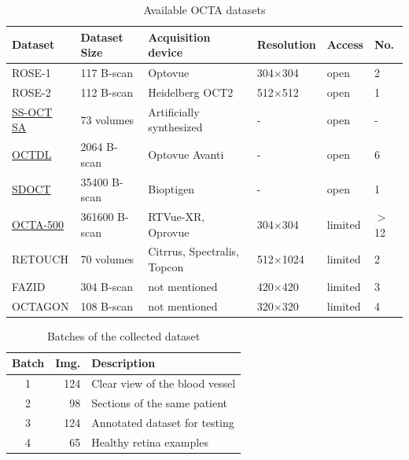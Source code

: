 \documentclass[conference]{IEEEtran}
\begin{document}
\begin{table}%
    \centering  %
    \caption{Available OCTA datasets}
    \label{tab:dataset_info}
    \begin{tabular}{llllll}
        \textbf{Dataset} & \textbf{Dataset Size} & \textbf{Acquisition device} & \textbf{Resolution} & \textbf{Access} & \textbf{No.} \\
        \hline
        ROSE-1 & 117 B-scan & Optovue & 304$\times$304 & open & 2 \\
        ROSE-2 & 112 B-scan & Heidelberg OCT2 & 512$\times$512 & open & 1 \\
        \href{https://ieee-dataport.org/documents/ss-oct-sa}{SS-OCT SA} & 73 volumes & Artificially synthesized & - & open & - \\
        \href{https://ieee-dataport.org/documents/octdl-optical-coherence-tomography-dataset-image-based-deep-learning-methods}{OCTDL} & 2064 B-scan & Optovue Avanti & - & open & 6 \\
        \href{https://people.duke.edu/~sf59/RPEDC_Ophth_2013_dataset.htm}{SDOCT} & 35400 B-scan & Bioptigen & - & open & 1 \\
        \href{https://ieee-dataport.org/open-access/octa-500}{OCTA-500} & 361600 B-scan & RTVue-XR, Oprovue & 304$\times$304 & limited & $>$12 \\
        RETOUCH & 70 volumes & Citrrus, Spectralis, Topcon & 512$\times$1024 & limited & 2 \\
        FAZID & 304 B-scan & not mentioned & 420$\times$420 & limited & 3 \\
        OCTAGON & 108 B-scan & not mentioned & 320$\times$320 & limited & 4 \\
    \end{tabular}
\end{table}

\begin{table}%
    \centering
    \caption{Batches of the collected dataset}
    \label{tab:batch_info}
    \begin{tabular}{crl}
        \textbf{Batch}  & \textbf{Img.}  & \textbf{Description} \\ \hline
        1  &  124 & Clear view of the blood vessel \\
        2  &  98  & Sections of the same patient \\
        3  &  124 & Annotated dataset for testing \\
        4  &   65 & Healthy retina examples \\
    \end{tabular}
\end{table}
\end{document}
